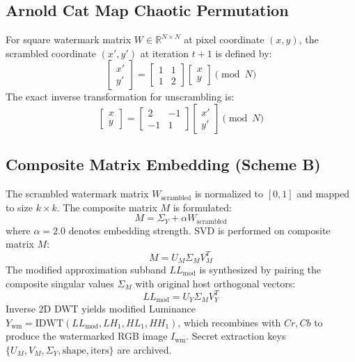 \documentclass[12pt,a4paper]{report}
\begin{document}
\subsection{Arnold Cat Map Chaotic Permutation}
For square watermark matrix $W \in \mathbb{R}^{N \times N}$ at pixel coordinate $(x, y)$, the scrambled coordinate $(x', y')$ at iteration $t+1$ is defined by:
\begin{equation}
    \begin{bmatrix} x' \\ y' \end{bmatrix} = \begin{bmatrix} 1 & 1 \\ 1 & 2 \end{bmatrix} \begin{bmatrix} x \\ y \end{bmatrix} \pmod N
\end{equation}
The exact inverse transformation for unscrambling is:
\begin{equation}
    \begin{bmatrix} x \\ y \end{bmatrix} = \begin{bmatrix} 2 & -1 \\ -1 & 1 \end{bmatrix} \begin{bmatrix} x' \\ y' \end{bmatrix} \pmod N
\end{equation}

\subsection{Composite Matrix Embedding (Scheme B)}
The scrambled watermark matrix $W_{\text{scrambled}}$ is normalized to $[0, 1]$ and mapped to size $k \times k$. The composite matrix $M$ is formulated:
\begin{equation}
    M = \Sigma_Y + \alpha W_{\text{scrambled}}
\end{equation}
where $\alpha = 2.0$ denotes embedding strength. SVD is performed on composite matrix $M$:
\begin{equation}
    M = U_M \Sigma_M V_M^T
\end{equation}
The modified approximation subband $LL_{\text{mod}}$ is synthesized by pairing the composite singular values $\Sigma_M$ with original host orthogonal vectors:
\begin{equation}
    LL_{\text{mod}} = U_Y \Sigma_M V_Y^T
\end{equation}
Inverse 2D DWT yields modified Luminance $Y_{\text{wm}} = \text{IDWT}(LL_{\text{mod}}, LH_1, HL_1, HH_1)$, which recombines with $Cr, Cb$ to produce the watermarked RGB image $I_{\text{wm}}$. Secret extraction keys $\{U_M, V_M, \Sigma_Y, \text{shape}, \text{iters}\}$ are archived.
\end{document}
